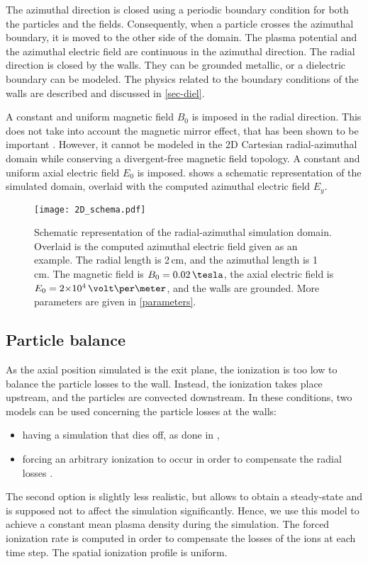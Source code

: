 The azimuthal direction is closed using a periodic boundary condition for both the particles and the fields.
Consequently, when a particle crosses the azimuthal boundary, it is moved to the other side of the domain.
The plasma potential and the azimuthal electric field are continuous in the azimuthal direction.
The radial direction is closed by the walls.
They can be grounded metallic, or a dielectric boundary can be modeled.
The physics related to the boundary conditions of the walls are described and discussed in \cref{sec-diel}.

A constant and uniform magnetic field $B_0$ is imposed in the radial direction.
This does not take into account the magnetic mirror effect, that has been shown to be important \citep{keidar2005,yu2008a,dominguez-vazquez2018}.
However, it cannot be modeled in the \ac{2D} Cartesian radial-azimuthal domain while conserving a divergent-free magnetic field topology.
A constant and uniform axial electric field $E_0$ is imposed.
 shows a schematic representation of the simulated domain, overlaid with the computed azimuthal electric field $E_y$.

\begin{figure}[hbt]
  \centering
  \texttt{[image: 2D\_schema.pdf]}
  \caption{Schematic representation of the radial-azimuthal simulation domain. Overlaid is the computed azimuthal electric field given as an example. The radial length is 2\,cm, and the azimuthal length is 1\,cm.
  The magnetic field is $B_0=0.02\,\tesla$, the axial electric field is $E_0=\sn{2}{4}\,\volt\per\meter$, and the walls are grounded. More parameters are given in \cref{parameters}.}
  \label{fig-2dschemat}
\end{figure}

\subsection{Particle balance}
As the axial position simulated is the exit plane, the ionization is too low to balance the particle losses to the wall.
Instead, the ionization takes place upstream, and the particles are convected downstream.
In these conditions, two models can be used concerning the particle losses at the walls\string:
\begin{itemize}
  \item having a simulation that dies off, as done in \citet{janhunen2018},
  \item forcing an arbitrary ionization to occur in order to compensate the radial losses \citep{dominguez-vazquez2018}.
\end{itemize}
The second option is slightly less realistic, but allows to obtain a steady-state and is supposed not to affect the simulation significantly.
Hence, we use this model to achieve a constant mean plasma density during the simulation.
The forced ionization rate is computed in order to compensate the losses of the ions at each time step.
The spatial ionization  profile is uniform.


